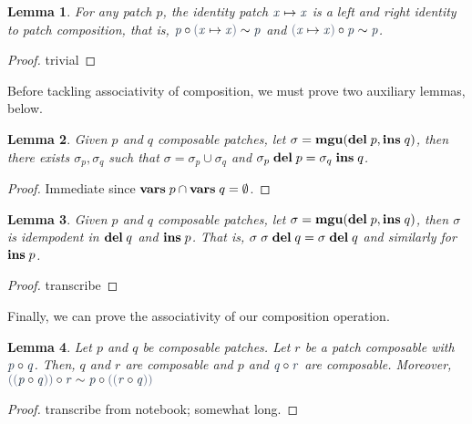 \documentclass{article}
\theoremstyle{definition}
\theoremstyle{plain}
\newtheorem{lemma}{Lemma}
\newcommand*{\mathcolor}{}
\def\mathcolor#1#{\mathcoloraux{#1}}
\newcommand*{\mathcoloraux}[3]{%
  \protect\leavevmode
  \begingroup
    \color#1{#2}#3%
  \endgroup
}
\newcommand{\HSSpecial}[1]{\mathcolor{hsblue4}{\ensuremath{#1}}}
\newcommand{\HSVar}[1]{\mathcolor{hsblue5}{\mathit{\ensuremath{#1}}}}
\begin{document}
\begin{lemma}
For any patch $p$, the identity patch \ensuremath{\patch{\HSVar{x}}{\HSVar{x}}} is a left and right
identity to patch composition, that is, \ensuremath{\after{\HSVar{p}}{\HSSpecial{(}\patch{\HSVar{x}}{\HSVar{x}}\HSSpecial{)}}\sim\HSVar{p}} and
\ensuremath{\after{\HSSpecial{(}\patch{\HSVar{x}}{\HSVar{x}}\HSSpecial{)}}{\HSVar{p}}\sim\HSVar{p}}.
\end{lemma}
\begin{proof}
trivial
\end{proof}

  Before tackling associativity of composition, we must prove
two auxiliary lemmas, below.

\begin{lemma}
  Given $p$ and $q$ composable patches, let $\sigma = \mathbf{mgu}(\mathbf{del}\;{p} , \mathbf{ins}\;{q})$,
then there exists $\sigma_p, \sigma_q$ such that $\sigma = \sigma_p \cup \sigma_q$ and
$\sigma_p \; \mathbf{del}\;{p} = \sigma_q \; \mathbf{ins}\;{q}$.
\end{lemma}
\begin{proof}
Immediate since $\mathbf{vars}\;p \cap \mathbf{vars}\;q = \emptyset$.
\end{proof}

\begin{lemma}
  Given $p$ and $q$ composable patches, let $\sigma = \mathbf{mgu}(\mathbf{del}\;{p} , \mathbf{ins}\;{q})$,
then $\sigma$ is idempodent in $\mathbf{del}\;{q}$ and $\mathbf{ins}\;{p}$. That is, $\sigma\;\sigma\;\mathbf{del}\;{q} = \sigma\;\mathbf{del}\;{q}$
and similarly for $\mathbf{ins}\;{p}$.
\end{lemma}
\begin{proof}
transcribe
\end{proof}

  Finally, we can prove the associativity of our composition operation.
  
\begin{lemma}
Let $p$ and $q$ be composable patches. Let $r$ be a patch composable
with \ensuremath{\after{\HSVar{p}}{\HSVar{q}}}. Then, $q$ and $r$ are composable and $p$ and \ensuremath{\after{\HSVar{q}}{\HSVar{r}}}
are composable. Moreover, \ensuremath{\after{\HSSpecial{(}\HSSpecial{(}\after{\HSVar{p}}{\HSVar{q}}\HSSpecial{)}\HSSpecial{)}}{\HSVar{r}}\sim\after{\HSVar{p}}{\HSSpecial{(}\HSSpecial{(}\after{\HSVar{r}}{\HSVar{q}}\HSSpecial{)}\HSSpecial{)}}}
\end{lemma}
\begin{proof}
transcribe from notebook; somewhat long.
\end{proof}
\end{document}
